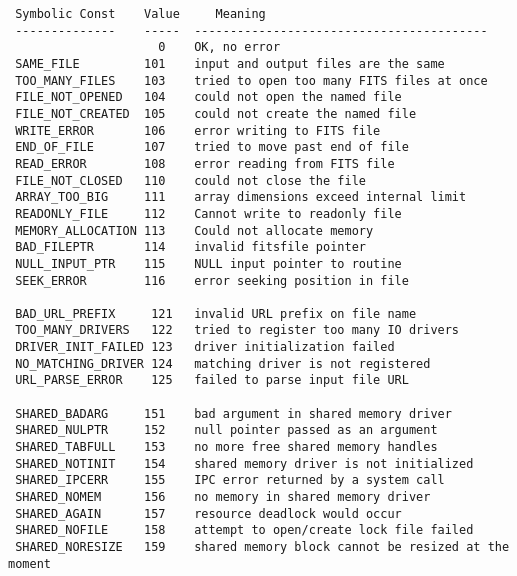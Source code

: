 \documentclass[11pt]{article}
\begin{document}
\begin{verbatim}
 Symbolic Const    Value     Meaning
 --------------    -----  -----------------------------------------
                     0    OK, no error
 SAME_FILE         101    input and output files are the same
 TOO_MANY_FILES    103    tried to open too many FITS files at once
 FILE_NOT_OPENED   104    could not open the named file
 FILE_NOT_CREATED  105    could not create the named file
 WRITE_ERROR       106    error writing to FITS file
 END_OF_FILE       107    tried to move past end of file
 READ_ERROR        108    error reading from FITS file
 FILE_NOT_CLOSED   110    could not close the file
 ARRAY_TOO_BIG     111    array dimensions exceed internal limit
 READONLY_FILE     112    Cannot write to readonly file
 MEMORY_ALLOCATION 113    Could not allocate memory
 BAD_FILEPTR       114    invalid fitsfile pointer
 NULL_INPUT_PTR    115    NULL input pointer to routine 
 SEEK_ERROR        116    error seeking position in file 

 BAD_URL_PREFIX     121   invalid URL prefix on file name 
 TOO_MANY_DRIVERS   122   tried to register too many IO drivers 
 DRIVER_INIT_FAILED 123   driver initialization failed 
 NO_MATCHING_DRIVER 124   matching driver is not registered 
 URL_PARSE_ERROR    125   failed to parse input file URL

 SHARED_BADARG     151    bad argument in shared memory driver
 SHARED_NULPTR     152    null pointer passed as an argument
 SHARED_TABFULL    153    no more free shared memory handles
 SHARED_NOTINIT    154    shared memory driver is not initialized
 SHARED_IPCERR     155    IPC error returned by a system call
 SHARED_NOMEM      156    no memory in shared memory driver
 SHARED_AGAIN      157    resource deadlock would occur
 SHARED_NOFILE     158    attempt to open/create lock file failed
 SHARED_NORESIZE   159    shared memory block cannot be resized at the moment


\end{verbatim}
\end{document}
